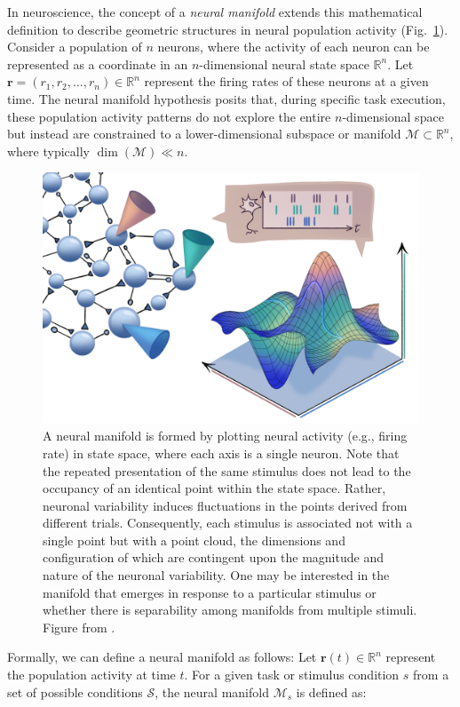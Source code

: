 \documentclass[11pt,a4paper]{article}
\begin{document}
In neuroscience, the concept of a \textit{neural manifold} extends this mathematical definition to describe geometric structures in neural population activity (Fig.~\ref{fig:manifolds}). Consider a population of $n$ neurons, where the activity of each neuron can be represented as a coordinate in an $n$-dimensional neural state space $\mathbb{R}^n$. Let $\mathbf{r} = (r_1, r_2, \ldots, r_n) \in \mathbb{R}^n$ represent the firing rates of these neurons at a given time. The neural manifold hypothesis posits that, during specific task execution, these population activity patterns do not explore the entire $n$-dimensional space but instead are constrained to a lower-dimensional subspace or manifold $\mathcal{M} \subset \mathbb{R}^n$, where typically $\dim(\mathcal{M}) \ll n$.

\begin{figure}
    \centering
    \includegraphics[width=0.75\linewidth]{figs/manifold_schematic.png}
    \caption{A neural manifold is formed by plotting neural activity (e.g., firing rate) in state space, where each axis is a single neuron. Note that the repeated presentation of the same stimulus does not lead to the occupancy of an identical point within the state space. Rather, neuronal variability induces fluctuations in the points derived from different trials. Consequently, each stimulus is associated not with a single point but with a point cloud, the dimensions and configuration of which are contingent upon the magnitude and nature of the neuronal variability. One may be interested in the manifold that emerges in response to a particular stimulus or whether there is separability among manifolds from multiple stimuli. Figure from \cite{Perich2024}.}
    \label{fig:manifolds}
\end{figure}

Formally, we can define a neural manifold as follows: Let $\mathbf{r}(t) \in \mathbb{R}^n$ represent the population activity at time $t$. For a given task or stimulus condition $s$ from a set of possible conditions $\mathcal{S}$, the neural manifold $\mathcal{M}_s$ is defined as:
\end{document}
